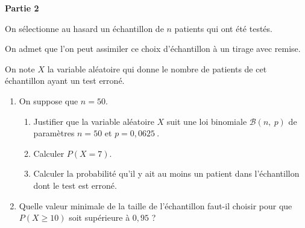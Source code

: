 \documentclass[10pt]{article}
\providecommand{\np}[2][]{{#2~#1}}
\begin{document}
\bigskip

\textbf{Partie 2}

\medskip

On sélectionne au hasard un échantillon de $n$ patients qui ont été testés.

On admet que l'on peut assimiler ce choix d'échantillon à un tirage avec remise.

On note $X$ la variable aléatoire qui donne le nombre de patients de cet échantillon ayant un test erroné.

\medskip

\begin{enumerate}
\item On suppose que $n = 50$.
	\begin{enumerate}
		\item Justifier que la variable aléatoire $X$ suit une loi binomiale $\mathcal{B}(n,\: p)$ de paramètres
$n = 50$ et $p = \np{0,0625}.$
		\item Calculer $P(X = 7)$.
		\item Calculer la probabilité qu'il y ait au moins un patient dans l'échantillon dont le test est erroné.
	\end{enumerate}	
\item Quelle valeur minimale de la taille de l'échantillon faut-il choisir pour que $P(X \geqslant 10)$ soit supérieure à $0,95$ ?
\end{enumerate}

\bigskip
\end{document}
